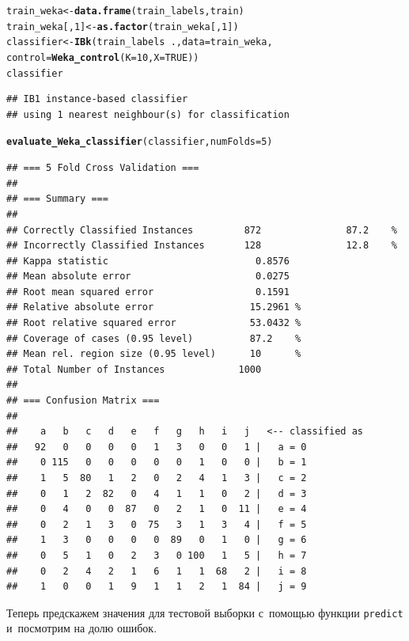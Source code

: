 \documentclass[final,pdftex]{../../template/epsilonj}\usepackage[]{graphicx}\usepackage[]{color}
\makeatletter
\newcommand{\hlnum}[1]{\textcolor[rgb]{0.686,0.059,0.569}{#1}}%
\newcommand{\hlopt}[1]{\textcolor[rgb]{0,0,0}{#1}}%
\newcommand{\hlstd}[1]{\textcolor[rgb]{0.345,0.345,0.345}{#1}}%
\newcommand{\hlkwb}[1]{\textcolor[rgb]{0.69,0.353,0.396}{#1}}%
\newcommand{\hlkwc}[1]{\textcolor[rgb]{0.333,0.667,0.333}{#1}}%
\newcommand{\hlkwd}[1]{\textcolor[rgb]{0.737,0.353,0.396}{\textbf{#1}}}%
\newenvironment{kframe}{%
 \def\at@end@of@kframe{}%
 \ifinner\ifhmode%
  \def\at@end@of@kframe{\end{minipage}}%
  \begin{minipage}{\columnwidth}%
 \fi\fi%
 \def\FrameCommand##1{\hskip\@totalleftmargin \hskip-\fboxsep
 \colorbox{shadecolor}{##1}\hskip-\fboxsep
     \hskip-\linewidth \hskip-\@totalleftmargin \hskip\columnwidth}%
 \MakeFramed {\advance\hsize-\width
   \@totalleftmargin\z@ \linewidth\hsize
   \@setminipage}}%
 {\par\unskip\endMakeFramed%
 \at@end@of@kframe}
\newenvironment{knitrout}{}{} %
\makeatother
\begin{document}
\begin{knitrout}
\begin{kframe}
\begin{alltt}
\hlstd{train_weka} \hlkwb{<-} \hlkwd{data.frame}\hlstd{(train_labels, train)}
\hlstd{train_weka[,}\hlnum{1}\hlstd{]} \hlkwb{<-} \hlkwd{as.factor}\hlstd{(train_weka[,}\hlnum{1}\hlstd{])}
\hlstd{classifier} \hlkwb{<-} \hlkwd{IBk}\hlstd{(train_labels}\hlopt{~}\hlstd{.,} \hlkwc{data} \hlstd{= train_weka,}
                  \hlkwc{control} \hlstd{=} \hlkwd{Weka_control}\hlstd{(}\hlkwc{K} \hlstd{=} \hlnum{10}\hlstd{,} \hlkwc{X}\hlstd{=}\hlnum{TRUE}\hlstd{))}
\hlstd{classifier}
\end{alltt}
\begin{verbatim}
## IB1 instance-based classifier
## using 1 nearest neighbour(s) for classification
\end{verbatim}
\begin{alltt}
\hlkwd{evaluate_Weka_classifier}\hlstd{(classifier,} \hlkwc{numFolds} \hlstd{=} \hlnum{5}\hlstd{)}
\end{alltt}
\begin{verbatim}
## === 5 Fold Cross Validation ===
## 
## === Summary ===
## 
## Correctly Classified Instances         872               87.2    %
## Incorrectly Classified Instances       128               12.8    %
## Kappa statistic                          0.8576
## Mean absolute error                      0.0275
## Root mean squared error                  0.1591
## Relative absolute error                 15.2961 %
## Root relative squared error             53.0432 %
## Coverage of cases (0.95 level)          87.2    %
## Mean rel. region size (0.95 level)      10      %
## Total Number of Instances             1000     
## 
## === Confusion Matrix ===
## 
##    a   b   c   d   e   f   g   h   i   j   <-- classified as
##   92   0   0   0   0   1   3   0   0   1 |   a = 0
##    0 115   0   0   0   0   0   1   0   0 |   b = 1
##    1   5  80   1   2   0   2   4   1   3 |   c = 2
##    0   1   2  82   0   4   1   1   0   2 |   d = 3
##    0   4   0   0  87   0   2   1   0  11 |   e = 4
##    0   2   1   3   0  75   3   1   3   4 |   f = 5
##    1   3   0   0   0   0  89   0   1   0 |   g = 6
##    0   5   1   0   2   3   0 100   1   5 |   h = 7
##    0   2   4   2   1   6   1   1  68   2 |   i = 8
##    1   0   0   1   9   1   1   2   1  84 |   j = 9
\end{verbatim}
\end{kframe}
\end{knitrout}

Теперь предскажем значения для тестовой выборки с~помощью функции \texttt{predict} и~посмотрим на долю ошибок.
\end{document}
